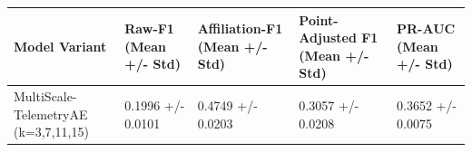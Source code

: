 \begin{tabular}{lllll}
\toprule
Model Variant & Raw-F1 (Mean +/- Std) & Affiliation-F1 (Mean +/- Std) & Point-Adjusted F1 (Mean +/- Std) & PR-AUC (Mean +/- Std) \\
\midrule
MultiScale-TelemetryAE (k=3,7,11,15) & 0.1996 +/- 0.0101 & 0.4749 +/- 0.0203 & 0.3057 +/- 0.0208 & 0.3652 +/- 0.0075 \\
\bottomrule
\end{tabular}

